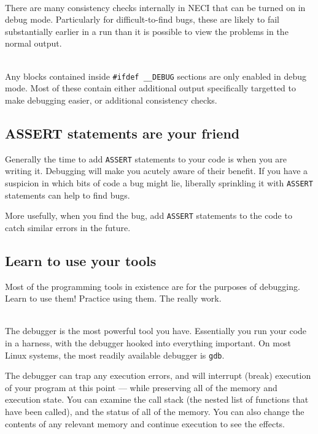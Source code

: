 \documentclass[a4paper,notitlepage]{scrreprt}
\newcommand\headitem[1]{\needspace{1.5\baselineskip}\item[{\boldmath #1 \nopagebreak}] \hfill \\ \nopagebreak}
\let\code\lstinline
\begin{document}
{{{\begin{description}
	\headitem{Enables the {\ttfamily ASSERT} macro}
		There are many consistency checks internally in NECI that can be turned
		on in debug mode. Particularly for difficult-to-find bugs, these are
		likely to fail substantially earlier in a run than it is possible to
		view the problems in the normal output.

	\headitem{Defines {\ttfamily \_\_DEBUG}}
		Any blocks contained inside \code{#ifdef __DEBUG} sections are
		only enabled in debug mode. Most of these contain either additional
		output specifically targetted to make debugging easier, or additional
		consistency checks.
\end{description}

\subsection{{\ttfamily ASSERT} statements are your friend}
	Generally the time to add \code{ASSERT} statements to your code is
	when you are writing it. Debugging will make you acutely aware of their
	benefit. If you have a suspicion in which bits of code a bug might lie,
	liberally sprinkling it with \code{ASSERT} statements can help to
	find bugs.

	More usefully, when you find the bug, add \code{ASSERT} statements to
	the code to catch similar errors in the future.

\subsection{Learn to use your tools}
	Most of the programming tools in existence are for the purposes of
	debugging. Learn to use them! Practice using them. The really work.

	\begin{description}
		\headitem{Debuggers}
			The debugger is the most powerful tool you have. Essentially you
			run your code in a harness, with the debugger hooked into
			everything important. On most Linux systems, the most readily
			available debugger is \code{gdb}.

			The debugger can trap any execution errors, and will interrupt
			(break) execution of your program at this point --- while
			preserving all of the memory and execution state. You can examine
			the call stack (the nested list of functions that have been
			called), and the status of all of the memory. You can also change
			the contents of any relevant memory and continue execution to see
			the effects.


\end{description}}}}
\end{document}
